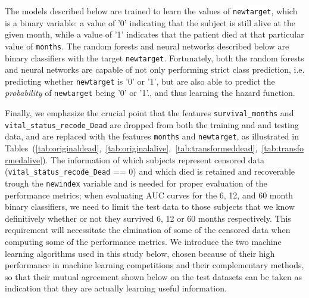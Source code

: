 \documentclass[10pt,letterpaper]{article}
\newcommand{\codewhite}[1]{\colorbox{white}{\texttt{#1}}}
\begin{document}
The models described below are trained to learn the values of \codewhite{newtarget}, which is a binary variable: a value of '0' indicating that the subject is still alive at the given month, while a value of '1' indicates that the patient died at that particular value of \codewhite{months}. The random forests and neural networks described below are binary classifiers with the target \codewhite{newtarget}. Fortunately, both the random forests and neural networks are capable of not only performing strict class prediction, i.e. predicting whether \codewhite{newtarget} is '0' or '1', but are also able to predict the \textit{probability} of \codewhite{newtarget} being '0' or '1'., and thus learning the hazard function.


Finally, we emphasize the crucial point that the features \codewhite{survival\_months} and \\
\codewhite{vital\_status\_recode\_Dead} are dropped from both the training and and testing data, and are replaced with the features \codewhite{months} and \codewhite{newtarget}, as illustrated in Tables~(\ref{tab:originaldead},~\ref{tab:originalalive},~\ref{tab:transformeddead},~\ref{tab:transformedalive}). The information of which subjects represent censored data (\codewhite{vital\_status\_recode\_Dead} == 0) and which died is retained and recoverable trough the \codewhite{newindex} variable and is needed for proper evaluation of the performance metrics; when evaluating AUC curves for the 6, 12, and 60 month binary classifiers, we need to limit the test data to those subjects that we know definitively whether or not they survived 6, 12 or 60 months respectively. This requirement will necessitate the elmination of some of the censored data when computing some of the performance metrics. We introduce the two machine learning algorithms used in this study below, chosen because of their high performance in machine learning competitions and their complementary methods, so that their mutual agreement shown below on the test datasets can be taken as indication that they are actually learning useful information.
\end{document}
